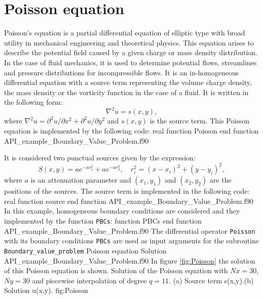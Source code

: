        
\newpage       
\section{Poisson equation}\label{Poisson}  
Poisson's equation is a partial differential equation of elliptic type with broad utility in mechanical engineering and theoretical physics. 
This equation arises to describe the potential field caused by a given charge or mass density distribution. 
In the case of fluid mechanics, it is used  to determine potential flows, streamlines and  pressure distributions for incompressible flows.   
It is an in-homogeneous differential equation with a source term representing the volume charge density, the mass density or the vorticity 
function in the case of a fluid. It is written in the following form:  
\begin{equation*}
             	\nabla^2 u = s(x,y), 
\end{equation*} 
where $\nabla^2 u = \partial^2 u / \partial x^2 + \partial^2 u / \partial y^2 $ and $ s(x,y) $ is the source term.
This Poisson equation is implemented by the following code: 
\vspace{0.8cm} 
         {real function Poisson}
         {end function}
         {API_example_Boundary_Value_Problem.f90}
         
 
It is considered two punctual sources given by the expression:
$$
      S(x, y) = a e ^{ -a r^2_1} + a e^{ -a r^2 _2 },  \quad r^2_i = (x-x_i)^ 2 + (y-y_i)^2, 
$$ 
where $ a $ is an attenuation parameter and $ (x_1, y_1) $ and  $ (x_2, y_2) $ are the positions of the sources.   
The source term is implemented in the following code:       
 \vspace{0.8cm} 
           {real function source}
           {end function}
           {API_example_Boundary_Value_Problem.f90}      
In this example, homogeneous boundary conditions are considered and they implemented by the  function \verb|PBCs|:  
 \vspace{0.5cm} 
          {function PBCs}
          {end function}
          {API_example_Boundary_Value_Problem.f90}
The differential operator \verb|Poisson|  with its boundary conditions \verb|PBCs| are used as input arguments for the subroutine 
\verb|Boundary_value_problem|               
\vspace{0.3cm} 
          {Poisson equation}
          {Solution}
          {API_example_Boundary_Value_Problem.f90}
In figure  \ref{fig:Poisson} the solution of this Poisson equation is shown. 
\vspace{-0.1cm}
   \twographs
       {}
       {}
       {Solution of the Poisson equation with $Nx = 30$, $Ny = 30$ and piecewise interpolation of degree $ q = 11$.
       (a) Source term s(x,y).(b) Solution u(x,y). }
       {fig:Poisson}    
       
